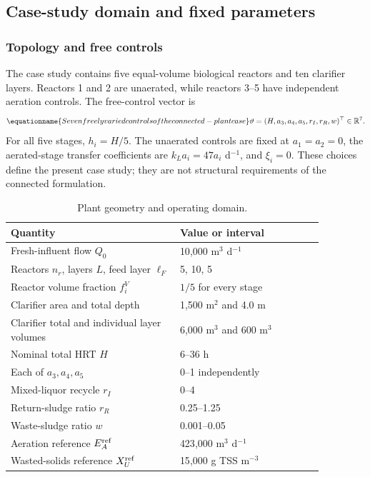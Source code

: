 \subsection{Case-study domain and fixed parameters}

\subsubsection{Topology and free controls}

The case study contains five equal-volume biological reactors and ten clarifier layers. Reactors 1 and 2 are unaerated, while reactors 3--5 have independent aeration controls. The free-control vector is
\begin{equation}
\equationname{Seven freely varied controls of the connected-plant case}
\vartheta=(H,a_3,a_4,a_5,r_I,r_R,w)^\top\in\mathbb R^7.
\label{eq:plant_case_controls}
\end{equation}
For all five stages, $h_i=H/5$. The unaerated controls are fixed at $a_1=a_2=0$, the aerated-stage transfer coefficients are $k_La_i=47a_i$ d$^{-1}$, and $\xi_i=0$. These choices define the present case study; they are not structural requirements of the connected formulation.

\begin{table}[htbp]
\centering\small
\caption{Plant geometry and operating domain.}
\label{tab:plant_operating_domain}
\begin{tabular}{p{0.47\linewidth}p{0.40\linewidth}}
\toprule
Quantity & Value or interval\\
\midrule
Fresh-influent flow $Q_0$ & 10{,}000 m$^3$ d$^{-1}$\\
Reactors $n_r$, layers $L$, feed layer $\ell_F$ & 5, 10, 5\\
Reactor volume fraction $f_i^V$ & $1/5$ for every stage\\
Clarifier area and total depth & 1{,}500 m$^2$ and 4.0 m\\
Clarifier total and individual layer volumes & 6{,}000 m$^3$ and 600 m$^3$\\
Nominal total HRT $H$ & 6--36 h\\
Each of $a_3,a_4,a_5$ & 0--1 independently\\
Mixed-liquor recycle $r_I$ & 0--4\\
Return-sludge ratio $r_R$ & 0.25--1.25\\
Waste-sludge ratio $w$ & 0.001--0.05\\
Aeration reference $E_A^{\rm ref}$ & 423{,}000 m$^3$ d$^{-1}$\\
Wasted-solids reference $X_U^{\rm ref}$ & 15{,}000 g TSS m$^{-3}$\\
\bottomrule
\end{tabular}
\end{table}

